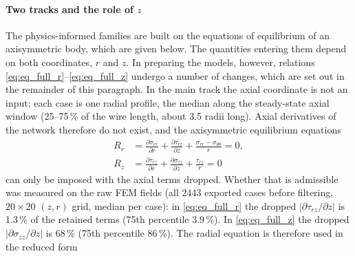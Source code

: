 \paragraph{Two tracks and the role of $z$}
The physics-informed families are built on the equations of equilibrium of an
axisymmetric body, which are given below. The quantities entering them depend
on both coordinates, $r$ and $z$. In preparing the models, however, relations
\eqref{eq:eq_full_r}--\eqref{eq:eq_full_z} undergo a number of changes, which
are set out in the remainder of this paragraph.
In the main track the axial coordinate is not an input: each case is one radial
profile, the median along the steady-state axial window (25--75\,\% of the wire
length, about 3.5 radii long).
Axial derivatives of the network therefore do not exist, and the axisymmetric
equilibrium equations
\begin{align}
  R_r &= \frac{\partial\sigma_{rr}}{\partial r}
        + \frac{\partial\tau_{rz}}{\partial z}
        + \frac{\sigma_{rr}-\sigma_{\theta\theta}}{r} = 0, \label{eq:eq_full_r}\\
  R_z &= \frac{\partial\tau_{rz}}{\partial r}
        + \frac{\partial\sigma_{zz}}{\partial z}
        + \frac{\tau_{rz}}{r} = 0 \label{eq:eq_full_z}
\end{align}
can only be imposed with the axial terms dropped. Whether that is admissible was
measured on the raw FEM fields (all 2443 exported cases before filtering, $20\times20$ $(z,r)$ grid, median per
case): in \eqref{eq:eq_full_r} the dropped $|\partial\tau_{rz}/\partial z|$ is
1.3\,\% of the retained terms (75th percentile 3.9\,\%). In \eqref{eq:eq_full_z}
the dropped $|\partial\sigma_{zz}/\partial z|$ is 68\,\% (75th percentile 86\,\%).
The radial equation is therefore used in the reduced form
